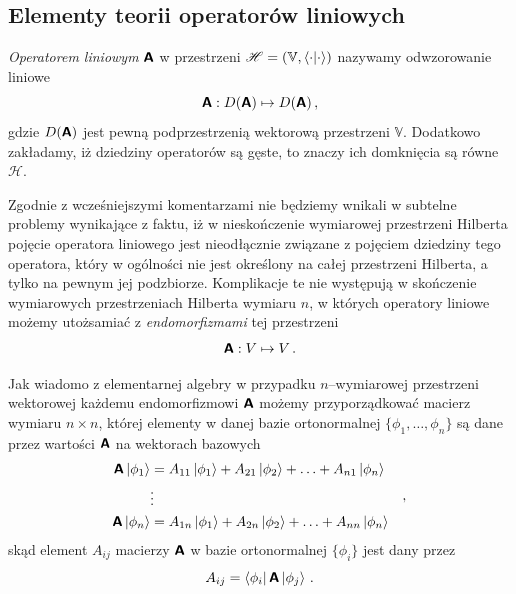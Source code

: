 \documentclass{myclass}
\begin{document}
\subsection{Elementy teorii operatorów liniowych}

\begin{definition}
\textit{Operatorem liniowym} \(\boldsymbol{\mathsf{A}}\) w przestrzeni \(\mathscr{H} = (\mathbb{V},
\braket{\cdot})\) nazywamy odwzorowanie liniowe 
\begin{equation*}
    \boldsymbol{\mathsf{A}} : D(\boldsymbol{\mathsf{A}}) \mapsto D(\boldsymbol{\mathsf{A}})\,,
\end{equation*}
gdzie \(D(\boldsymbol{\mathsf{A}})\) jest pewną podprzestrzenią wektorową przestrzeni \(\mathbb{V}\). Dodatkowo
zakładamy, iż dziedziny operatorów są gęste, to znaczy ich domknięcia są równe \(\mathscr{H}\).
\end{definition}

Zgodnie z wcześniejszymi komentarzami nie będziemy wnikali w subtelne problemy wynikające z faktu,
iż w nieskończenie wymiarowej przestrzeni Hilberta pojęcie operatora liniowego jest nieodłącznie
związane z pojęciem dziedziny tego operatora, który w ogólności nie jest określony na całej
przestrzeni Hilberta, a tylko na pewnym jej podzbiorze. Komplikacje te nie występują w skończenie
wymiarowych przestrzeniach Hilberta wymiaru \(n\), w których operatory liniowe możemy utożsamiać z
\textit{endomorfizmami} tej przestrzeni
\begin{equation*}
\boldsymbol{\mathsf{A}}: V \mapsto V\,.
\end{equation*}

Jak wiadomo z elementarnej algebry w przypadku \(n\)--wymiarowej przestrzeni wektorowej każdemu
endomorfizmowi \(\boldsymbol{\mathsf{A}}\) możemy przyporządkować macierz wymiaru \(n\times n\), której elementy w
danej bazie ortonormalnej \(\{\phi_1,\ldots,\phi_n\}\) są dane przez wartości \(\boldsymbol{\mathsf{A}}\) na
wektorach bazowych
\begin{equation*}
\begin{split}
\boldsymbol{\mathsf{A}}\ket{\phi_1} &= A_{11}\ket{\phi_1} + A_{21}\ket{\phi_2} + \ldots + A_{n1}\ket{\phi_n}\\
&\vdots\\
\boldsymbol{\mathsf{A}}\ket{\phi_n} &= A_{1n}\ket{\phi_1} + A_{2n}\ket{\phi_2} + \ldots + A_{nn}\ket{\phi_n}
\end{split}\quad,
\end{equation*}
skąd element \(A_{ij}\) macierzy \(\boldsymbol{\mathsf{A}}\) w bazie ortonormalnej \(\{\phi_i\}\) jest dany przez
\begin{equation*}
A_{ij} = \bra{\phi_i}\boldsymbol{\mathsf{A}}\ket{\phi_j}\,.
\end{equation*}
\end{document}
